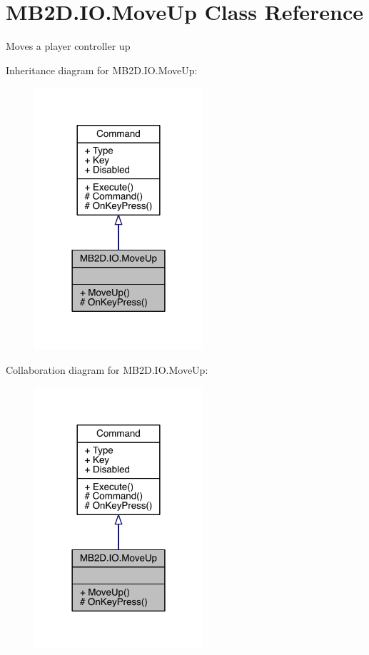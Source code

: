 \hypertarget{class_m_b2_d_1_1_i_o_1_1_move_up}{}\section{M\+B2\+D.\+I\+O.\+Move\+Up Class Reference}
\label{class_m_b2_d_1_1_i_o_1_1_move_up}


Moves a player controller up  




Inheritance diagram for M\+B2\+D.\+I\+O.\+Move\+Up\+:
\nopagebreak
\begin{figure}[H]
\begin{center}
\leavevmode
\includegraphics[width=177pt]{class_m_b2_d_1_1_i_o_1_1_move_up__inherit__graph}
\end{center}
\end{figure}


Collaboration diagram for M\+B2\+D.\+I\+O.\+Move\+Up\+:
\nopagebreak
\begin{figure}[H]
\begin{center}
\leavevmode
\includegraphics[width=177pt]{class_m_b2_d_1_1_i_o_1_1_move_up__coll__graph}
\end{center}
\end{figure}
